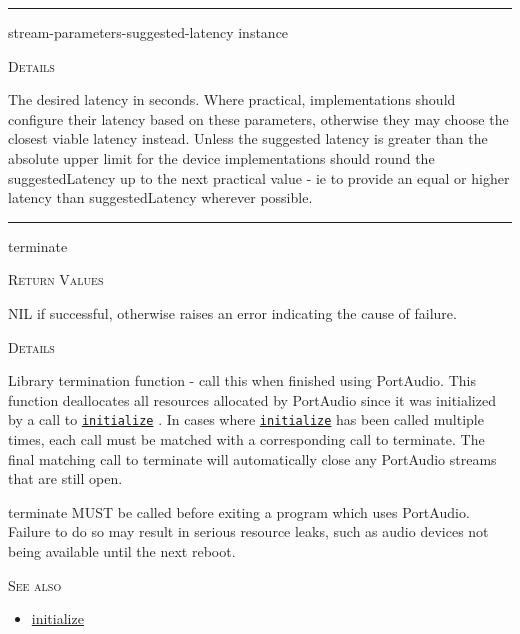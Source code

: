 \documentclass[a4paper]{report}
\begin{document}
  

    \rule{\linewidth}{0.1mm}
    
    \label{portaudio__fun__stream-parameters-suggested-latency}
    \begin{defun}[Function]
    stream-parameters-suggested-latency instance


	
    \bigskip
    \textsc{Details}

The desired latency in seconds. Where practical, implementations should configure their latency based on these parameters, otherwise they may choose the closest viable latency instead. Unless the suggested latency is greater than the absolute upper limit for the device implementations should round the suggestedLatency up to the next practical value - ie to provide an equal or higher latency than suggestedLatency wherever possible.


    
    \end{defun}
  
  

    \rule{\linewidth}{0.1mm}
    
    \label{portaudio__fun__terminate}
    \begin{defun}[Function]
    terminate


    
    \bigskip
    \textsc{Return Values}


NIL if successful, otherwise raises an error indicating the cause of failure.


	
    \bigskip
    \textsc{Details}

Library termination function - call this when finished using PortAudio. This function deallocates all resources allocated by PortAudio since it was initialized by a call to \hyperref[portaudio__fun__initialize]{\texttt{initialize}}
  . In cases where \hyperref[portaudio__fun__initialize]{\texttt{initialize}}
   has been called multiple times, each call must be matched with a corresponding call to terminate. The final matching call to terminate will automatically close any PortAudio streams that are still open.


terminate MUST be called before exiting a program which uses PortAudio. Failure to do so may result in serious resource leaks, such as audio devices not being available until the next reboot.




      
    \bigskip
    \textsc{See also}


	
    \begin{itemize}
    
	  
    \item
    \hyperref[portaudio__fun__initialize]{initialize}
    
	
    \end{itemize}
  
      


    
    \end{defun}
  
\end{document}
